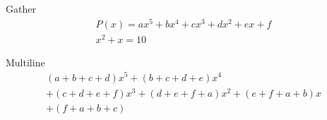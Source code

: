 \documentclass[a4paper]{article}
\begin{document}
	Gather
	\begin{gather}
		P(x)=ax^{5}+bx^{4}+cx^{3}+dx^{2}+ex +f\\
		x^2+x=10
	\end{gather}
	
	Multiline
	\begin{multline*}
		(a+b+c+d)x^{5}+(b+c+d+e)x^{4} \\
		+(c+d+e+f)x^{3}+(d+e+f+a)x^{2}+(e+f+a+b)x\\
		+ (f+a+b+c)
	\end{multline*}
\end{document}
